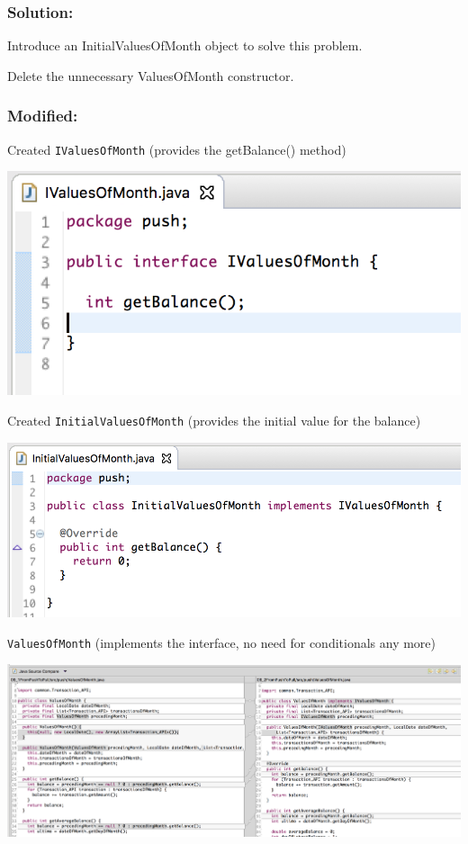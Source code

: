 \documentclass[a4paper,fleqn,titlepage,11pt]{article}
\begin{document}
\subsubsection*{Solution:}

Introduce an InitialValuesOfMonth object to solve this problem.

Delete the unnecessary ValuesOfMonth constructor.

\subsubsection*{Modified:}

Created \texttt{IValuesOfMonth} (provides the getBalance() method)

\includegraphics[width=1\textwidth]{CompareViews/09_2-3.png}

Created \texttt{InitialValuesOfMonth} (provides the initial value for the balance)

\includegraphics[width=1\textwidth]{CompareViews/09_2-4.png}

\texttt{ValuesOfMonth} (implements the interface, no need for conditionals any more)

\includegraphics[width=1\textwidth]{CompareViews/09_1-09_2-1.png}
\end{document}
